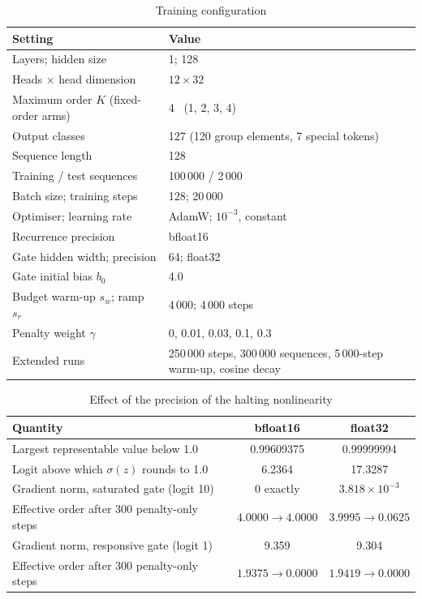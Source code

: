 \begin{table}[ht]
	\caption{Training configuration}
	\centering
	\begin{tabular}{p{5.6cm} p{7.6cm}}
		\toprule
		\textbf{Setting} & \textbf{Value} \\
		\midrule
		Layers; hidden size & 1; 128 \\
		Heads $\times$ head dimension & $12 \times 32$ \\
		Maximum order $K$ (fixed-order arms) & 4 \ (1, 2, 3, 4) \\
		Output classes & 127 (120 group elements, 7 special tokens) \\
		Sequence length & 128 \\
		Training / test sequences & 100\,000 / 2\,000 \\
		Batch size; training steps & 128; 20\,000 \\
		Optimiser; learning rate & AdamW; $10^{-3}$, constant \\
		Recurrence precision & bfloat16 \\
		Gate hidden width; precision & 64; float32 \\
		Gate initial bias $b_0$ & 4.0 \\
		Budget warm-up $s_w$; ramp $s_r$ & 4\,000; 4\,000 steps \\
		Penalty weight $\gamma$ & 0, 0.01, 0.03, 0.1, 0.3 \\
		Extended runs & 250\,000 steps, 300\,000 sequences, 5\,000-step warm-up, cosine decay \\
		\bottomrule
	\end{tabular}
	\label{tab:config}
\end{table}

\begin{table}[ht]
	\caption{Effect of the precision of the halting nonlinearity}
	\centering
	\small
	\begin{tabular}{l c c}
		\toprule
		\textbf{Quantity} & \textbf{bfloat16} & \textbf{float32} \\
		\midrule
		Largest representable value below 1.0 & 0.99609375 & 0.99999994 \\
		Logit above which $\sigma(z)$ rounds to 1.0 & 6.2364 & 17.3287 \\
		\midrule
		Gradient norm, saturated gate (logit 10) & $0$ exactly & $3.818\times10^{-3}$ \\
		Effective order after 300 penalty-only steps & $4.0000 \to 4.0000$ & $3.9995 \to 0.0625$ \\
		\midrule
		Gradient norm, responsive gate (logit 1) & 9.359 & 9.304 \\
		Effective order after 300 penalty-only steps & $1.9375 \to 0.0000$ & $1.9419 \to 0.0000$ \\
		\bottomrule
	\end{tabular}
	\label{tab:precision}
\end{table}

